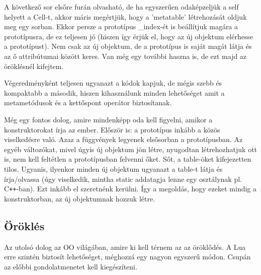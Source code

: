 A következő sor elsőre furán olvasható, de ha egyszerűen odaképzeljük a self helyett a Cell-t, akkor máris megértjük, hogy a 'metatable' létrehozását oldjuk meg egy sorban. Ekkor persze a prototípus \_index-ét is beállítjuk magára a prototípusra, de ez teljesen jó (hiszen így érjük el, hogy az új objektum elérhesse a prototípust). Nem csak az új objektum, de a prototípus is saját magát látja és az ő attribútumai között keres. Van még egy további haszna is, de ezt majd az öröklésnél kifejtem.

Végeredményként teljesen ugyanazt a kódok kapjuk, de mégis szebb és kompaktabb a második, hiszen kihasználunk minden lehetőséget amit a metametódusok és a kettőspont operátor biztosítanak. 

Még egy fontos dolog, amire mindenképp oda kell figyelni, amikor a konstruktorokat írja az ember. Először is: a prototípus inkább a közös viselkedésre való. Azaz a függvények legyenek elsősorban a prototípusban. Az egyéb változókat, mivel úgyis új objektum jön létre, nyugodtan létrehozhatjuk ott is, nem kell feltétlen a prototípusban felvenni őket. Sőt, a table-öket kifejezetten tilos. Ugyanis, ilyenkor minden új objektum ugyanazt a table-t látja és írja/olvassa (úgy viselkedik, mintha static addatagja lenne egy osztálynak pl. C\verb|++|-ban). Ezt inkább el szeretnénk kerülni. Így a megoldás, hogy ezeket mindig a konstruktorban, az új objektumnak hozzuk létre.

\subsection{Öröklés}
\label{subsec:l_inherit}

Az utolsó dolog az OO világában, amire ki kell térnem az az öröklődés. A Lua erre szintén biztosít lehetőséget, méghozzá egy nagyon egyszerű módon. Csupán az előbbi gondolatmenetet kell kiegészíteni.

